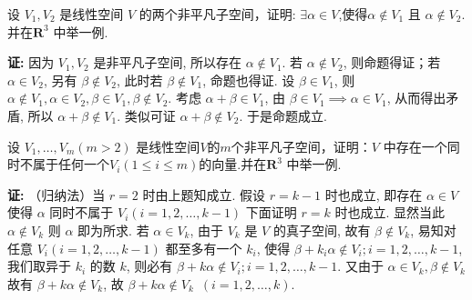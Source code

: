 \begin{exercise}
\begin{exgroup}
        \item 设 $V_1,V_2$ 是线性空间 $V$ 的两个非平凡子空间，证明: $\exists \alpha \in V$,使得$\alpha \notin V_1$ 且 $\alpha \notin V_2$.并在$\mathbf{R}^3$ 中举一例.
        \begin{answer}
            \textbf{证:} 因为 $V_1, V_2$ 是非平凡子空间, 所以存在 $\alpha \notin V_1$. 若 $\alpha \notin V_2$, 则命题得证；若 $\alpha \in V_2$, 另有 $\beta \notin V_2$, 此时若 $\beta \notin V_1$, 命题也得证. 设 $\beta \in V_1$, 则 $\alpha \notin V_1, \alpha \in V_2, \beta \in V_1, \beta \notin V_2$.
            考虑 $\alpha + \beta \in V_1$, 由 $\beta \in V_1 \implies \alpha \in V_1$, 从而得出矛盾, 所以 $\alpha + \beta \notin V_1$. 类似可证 $\alpha + \beta \notin V_2$. 于是命题成立.
        \end{answer}
        \item 设 $V_1,\ldots,V_m (m > 2)$ 是线性空间$V$的$m$个非平凡子空间，证明：$V$ 中存在一个同时不属于任何一个$V_i(1 \leqslant i \leqslant m)$的向量.并在$\mathbf{R}^3$ 中举一例.
        \begin{answer}\label{eg:4:A:5}
          \textbf{证:} （归纳法）当 $r=2$ 时由上题知成立.
          假设 $r = k-1$ 时也成立, 即存在 $\alpha \in V$
          使得 $\alpha$ 同时不属于 $V_i (i=1,2,\ldots,k-1)$
          下面证明 $r=k$ 时也成立. 显然当此 $\alpha \notin V_k$ 则 $\alpha$ 即为所求.
           若 $\alpha \in V_k$, 由于 $V_k$ 是 $V$ 的真子空间, 故有 $\beta \notin V_k$, 易知对任意 $V_i (i=1,2,\ldots,k-1)$ 都至多有一个 $k_i$, 使得 $\beta + k_i \alpha \notin V_i; i=1,2,\ldots,k-1$, 我们取异于 $k_i$ 的数 $k$, 则必有 $\beta + k \alpha \notin V_i; i=1,2,\ldots,k-1$. 又由于 $\alpha \in V_k, \beta \notin V_k$ 故有 $\beta + k \alpha \notin V_k$, 故 $\beta + k \alpha \notin V_k \enspace (i = 1,2,\ldots,k)$.
        \end{answer}
    \end{exgroup}


\end{exercise}
